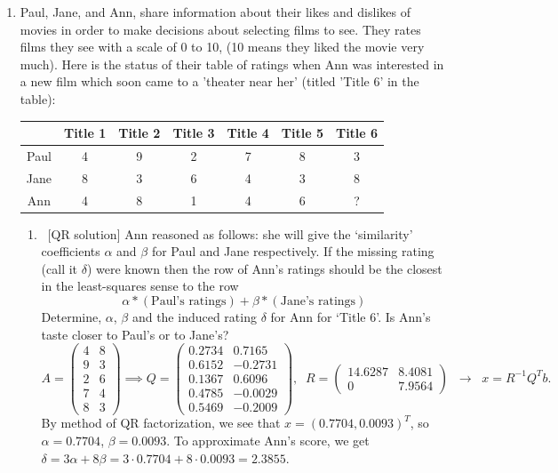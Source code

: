 \documentclass[11pt]{article}
\newcommand{\n}{\vspace{0.3cm}}
\begin{document}
\begin{enumerate}
	\item Paul, Jane, and Ann, share information about their likes and dislikes of movies in order to make decisions about selecting films to see. They rates films they see with a scale of 0 to 10, (10 means they liked the movie very much). Here is the status of their table of ratings when Ann was interested in a new film which soon came to a ’theater near her’ (titled ’Title 6’ in the table):
	      \begin{center}
		      \begin{tabular}{|c|c|c|c|c|c|c|}
			      \hline
			           & Title 1 & Title 2 & Title 3 & Title 4 & Title 5 & Title 6 \\
			      \hline
			      Paul & 4       & 9       & 2       & 7       & 8       & 3       \\
			      \hline
			      Jane & 8       & 3       & 6       & 4       & 3       & 8       \\
			      \hline
			      Ann  & 4       & 8       & 1       & 4       & 6       & ?       \\
			      \hline
		      \end{tabular}
	      \end{center}
	      \begin{enumerate}
		      \item\ [QR solution] Ann reasoned as follows: she will give the `similarity’ coefficients \(\alpha\) and \(\beta\) for Paul and Jane respectively.  If the missing rating (call it \(\delta\)) were known then the row of Ann’s ratings should be the closest in the least-squares sense to the row
		      \[\alpha * (\text{Paul's ratings}) + \beta * (\text{Jane's ratings})\]
		      Determine, \(\alpha\), \(\beta\) and the induced rating \(\delta\) for Ann for `Title 6'.  Is Ann’s taste closer to Paul’s or to Jane’s?
          \[
            A = \begin{pmatrix} 4 & 8 \\ 9 & 3 \\ 2 & 6 \\ 7 & 4 \\ 8 & 3 \end{pmatrix}
            \implies
            Q = \begin{pmatrix} 0.2734 & 0.7165 \\ 0.6152 & -0.2731 \\ 0.1367 & 0.6096 \\ 0.4785 & -0.0029 \\ 0.5469 & -0.2009 \end{pmatrix}, \;\;
            R = \begin{pmatrix} 14.6287 & 8.4081 \\ 0 & 7.9564 \end{pmatrix} \;\;\to\;\;
            x = R^{-1}Q^T b.
          \]
          By method of QR factorization, we see that \(x = (0.7704, 0.0093)^T\), so \(\alpha=0.7704\), \(\beta=0.0093\).  To approximate Ann's score, we get \(\delta = 3\alpha + 8\beta = 3 \cdot 0.7704 + 8 \cdot 0.0093 = 2.3855\). \n


\end{enumerate}
\end{enumerate}
\end{document}
